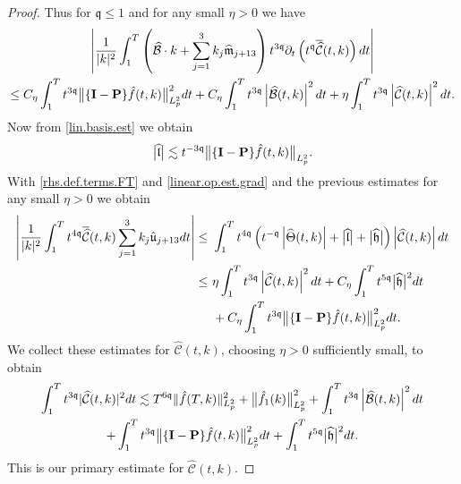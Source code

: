\documentclass[reqno]{amsart}
\newcommand{\pv}{p}
\def\norm#1{\big\Vert#1\big\Vert}
\newcommand{\qq}{\mathfrak{q}}
\newcommand{\tq}{t^{\qq}}
\newcommand{\tmq}{t^{-\qq}}
\newcommand{\tTq}{t^{3\qq}}
\newcommand{\tmTq}{t^{-3\qq}}
\newcommand{\micro}{{\bf \{I- P\}}}
\newcommand{\highG}{\Theta}
\theoremstyle{definition}
\numberwithin{equation}{section}
\numberwithin{theorem}{section}
\begin{document}
\begin{proof}
Thus for $\qq \leq 1$ and for any small $\eta>0$ we have
\begin{multline*}
    \left|
\frac{1}{|k|^2} \int_1^{T} \left( \widehat{\mathcal{B}}\cdot k +\sum_{j=1}^3 k_j    \widehat{\mathfrak{m}}_{j+13} \right) \tTq\partial_t  \left(\tq\overline{\widehat{\mathcal{C}}}(t,k)\right) dt
\right|
\\
\leq
C_\eta\int_1^{T} \tTq\norm{\micro \hat{f}(t,k)}_{L^2_{\pv}}^2dt
+
C_\eta \int^{T}_{1} \tTq \left|\widehat{{\mathcal{B}}}(t,k)\right|^2 dt 
+
\eta \int^{T}_{1} \tTq \left|\widehat{\mathcal{C}}(t,k)\right|^2 dt. 
\end{multline*}
Now from \eqref{lin.basis.est} we obtain
\begin{align}\label{linear.op.est.grad}
\big| \widehat{\mathfrak{l}}\big|
 \lesssim 
 \tmTq
\norm{\micro \hat{f}(t,k)}_{L^2_{\pv}}.
\end{align}
With \eqref{rhs.def.terms.FT} and \eqref{linear.op.est.grad} and the previous estimates for any small $\eta>0$ we obtain
\begin{align*}
\left|  \frac{1}{|k|^2} \int_1^{T}t^{4\qq}\overline{\widehat{\mathcal{C}}}(t,k)  \sum_{j=1}^3 k_j\hat{\mathfrak{u}}_{j+13} dt
 \right|
 \leq &~
\int_1^{T}
 t^{4\qq}\left( \tmq\left|\widehat{\highG}(t,k)\right|+\big| \widehat{\mathfrak{l}}\big|+\big| \widehat{\mathfrak{h}}\big|\right) \left|\widehat{{\mathcal{C}}}(t,k)\right| dt
 \\
  \leq &~
  \eta \int^{T}_{1} \tTq  \left|\widehat{{\mathcal{C}}}(t,k)\right|^2 dt
  +C_\eta\int_1^{T} t^{5\qq}\big| \widehat{\mathfrak{h}}\big|^2dt
  \\
&~
+C_\eta\int_1^{T} \tTq\norm{\micro \hat{f}(t,k)}_{L^2_{\pv}}^2dt.
\end{align*}
We collect these estimates for $\widehat{\mathcal{C}}(t,k)$, choosing $\eta>0$ sufficiently small, to obtain
\begin{multline}\label{FT.C.estimate}
\int_1^{T} \tTq|\widehat{\mathcal{C}}(t,k)|^2  dt
\lesssim
 T^{6\qq}\Vert \hat{f}(T,k)\Vert_{L^2_{\pv}}^2+\norm{ \hat{f}_1(k)}_{L^2_{\pv}}^2
  +
\int^{T}_{1} \tTq \left|\widehat{{\mathcal{B}}}(t,k)\right|^2 dt 
 \\
+\int_1^{T} \tTq\norm{\micro \hat{f}(t,k)}_{L^2_{\pv}}^2dt
+\int_1^{T} t^{5\qq}\big| \widehat{\mathfrak{h}}\big|^2dt.
\end{multline}
This is our primary estimate for $\widehat{\mathcal{C}}(t,k)$.




\end{proof}
\end{document}
